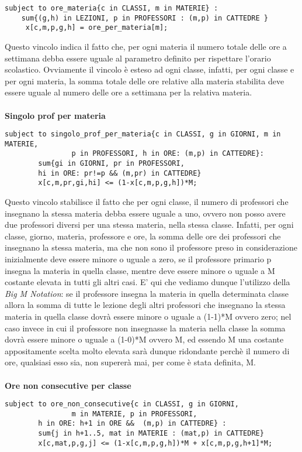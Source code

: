 \documentclass{article}
\begin{document}
\begin{verbatim}
subject to ore_materia{c in CLASSI, m in MATERIE} :
	sum{(g,h) in LEZIONI, p in PROFESSORI : (m,p) in CATTEDRE }
	 x[c,m,p,g,h] = ore_per_materia[m];
\end{verbatim}
Questo vincolo indica il fatto che, per ogni materia il numero totale delle ore a settimana debba essere uguale al parametro definito per rispettare l'orario scolastico. Ovviamente il vincolo è esteso ad ogni classe, infatti, per ogni classe e per ogni materia, la somma totale delle ore relative alla materia stabilita deve essere uguale al numero delle ore a settimana per la relativa materia.
\\\\\textbf{Singolo prof per materia}
\begin{verbatim}
subject to singolo_prof_per_materia{c in CLASSI, g in GIORNI, m in MATERIE, 
                p in PROFESSORI, h in ORE: (m,p) in CATTEDRE}:
		sum{gi in GIORNI, pr in PROFESSORI, 
		hi in ORE: pr!=p && (m,pr) in CATTEDRE}
		x[c,m,pr,gi,hi] <= (1-x[c,m,p,g,h])*M;
\end{verbatim}
Questo vincolo stabilisce il fatto che per ogni classe, il numero di professori che insegnano la stessa materia debba essere uguale a uno, ovvero non posso avere due professori diversi per una stessa materia, nella stessa classe. Infatti, per ogni classe, giorno, materia, professore e ore, la somma delle ore dei professori che insegnano la stessa materia, ma che non sono il professore preso in considerazione inizialmente deve essere minore o uguale a zero, se il professore primario p insegna la materia in quella classe, mentre deve essere minore o uguale a M costante elevata in tutti gli altri casi. E' qui che vediamo dunque l'utilizzo della \emph{Big M Notation}: se il professore insegna la materia in quella determinata classe allora la somma di tutte le lezione degli altri professori che insegnano la stessa materia in quella classe dovrà essere minore o uguale a (1-1)*M ovvero zero; nel caso invece in cui il professore non insegnasse la materia nella classe la somma dovrà essere minore o uguale a (1-0)*M ovvero M, ed essendo M una costante appositamente scelta molto elevata sarà dunque ridondante perchè il numero di ore, qualsiasi esso sia, non supererà mai, per come è stata definita, M.
\\\\\textbf{Ore non consecutive per classe}
\begin{verbatim}
subject to ore_non_consecutive{c in CLASSI, g in GIORNI,
                m in MATERIE, p in PROFESSORI, 
		h in ORE: h+1 in ORE &&  (m,p) in CATTEDRE} :
		sum{j in h+1..5, mat in MATERIE : (mat,p) in CATTEDRE} 
		x[c,mat,p,g,j] <= (1-x[c,m,p,g,h])*M + x[c,m,p,g,h+1]*M;
\end{verbatim}
\end{document}
